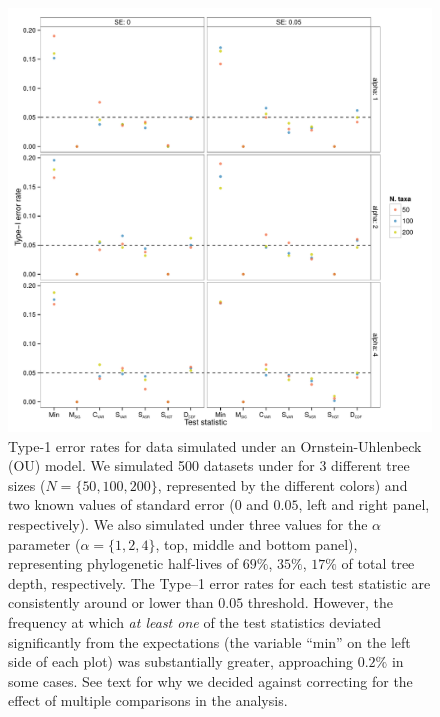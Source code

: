 \begin{figure}[p]
  \centering
  \includegraphics[width=\textwidth]{figs/ou-sim-res}
  \caption[Type-1 error rates for data simulated under Ornstein-Uhlenbeck]{Type-1 error rates for data simulated under an Ornstein-Uhlenbeck (OU) model. We simulated 500 datasets under for 3 different tree sizes ($N=\lbrace 50, 100, 200 \rbrace$, represented by the different colors) and two known values of standard error ($0$ and $0.05$, left and right panel, respectively). We also simulated under three values for the $\alpha$ parameter ($\alpha=\lbrace 1,2,4 \rbrace$, top, middle and bottom panel), representing phylogenetic half-lives of $69\%$, $35\%$, $17\%$ of total tree depth, respectively.  The Type--1 error rates for each test statistic are consistently around or lower than $0.05$ threshold. However, the frequency at which \emph{at least one} of the test statistics deviated significantly from the expectations (the variable ``min'' on the left side of each plot) was substantially greater, approaching $0.2\%$ in some cases. See text for why we decided against correcting for the effect of multiple comparisons in the analysis.}
  \label{fig:ou-sim}
\end{figure}

